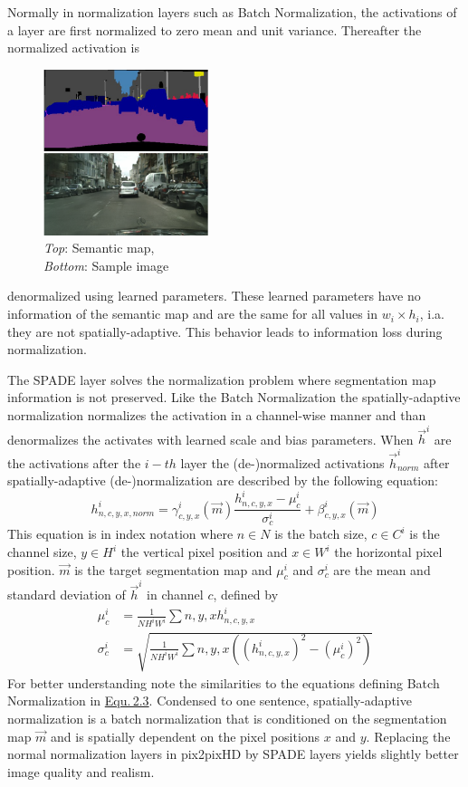 Normally in normalization layers such as Batch Normalization, the activations of a layer are first normalized to zero mean and unit variance. Thereafter the normalized activation is 
%
\begin{figure}
    \begin{center}
        \includegraphics[width=0.43\textwidth]{Chapters/figures/spade_example.PNG}
    \end{center}
    \caption{\textit{Top}: Semantic map, \\\textit{Bottom}: Sample image}
\end{figure}
%
denormalized using learned parameters. These learned parameters have no information of the semantic map and are the same for all values in $w_i\times h_i$, i.a. they are not spatially-adaptive. This behavior leads to information loss during normalization.

The SPADE layer solves the normalization problem where segmentation map information is not preserved. Like the Batch Normalization the spatially-adaptive normalization normalizes the activation in a channel-wise manner and than denormalizes the activates with learned scale and bias parameters. When $\vec{h}^i$ are the activations after the $i-th$ layer the (de-)normalized activations $\vec{h}_{norm}^i$ after spatially-adaptive (de-)normalization are described by the following equation:
%
\begin{equation}
    h_{n,c,y,x,norm}^i=\gamma_{c,y,x}^i(\vec{m})\frac{h_{n,c,y,x}^i-\mu_c^i}{\sigma_c^i}+\beta_{c,y,x}^i(\vec{m})
\end{equation}
%
This equation is in index notation where $n\in N$ is the batch size, $c\in C^i$ is the channel size, $y\in H^i$ the vertical pixel position and $x\in W^i$ the horizontal pixel position. $\vec{m}$ is the target segmentation map and $\mu_c^i$ and $\sigma_c^i$ are the mean and standard deviation of $\vec{h}^i$ in channel $c$, defined by 
%
\begin{align}
    \mu_c^i&=\frac{1}{NH^iW^i}\sum{n,y,x}h_{n,c,y,x}^i\\[1ex]
    \sigma_c^i&=\sqrt{\frac{1}{NH^iW^i}\sum{n,y,x}\left((h_{n,c,y,x}^i)^2-(\mu_c^i)^2\right)}
\end{align}
%
For better understanding note the similarities to the equations defining Batch Normalization in \hyperref[equ:2.3]{Equ.\,2.3}. Condensed to one sentence, spatially-adaptive normalization is a batch normalization that is conditioned on the segmentation map $\vec{m}$ and is spatially dependent on the pixel positions $x$ and $y$. Replacing the normal normalization layers in pix2pixHD by SPADE layers yields slightly better image quality and realism.